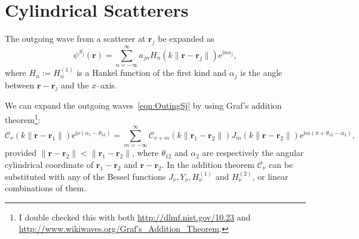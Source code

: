 \documentclass[ 12pt, a4paper]{article}
\newcommand{\be}{\begin{equation}}
\newcommand{\en}{\end{equation}}
\def\bga#1\ega{\begin{gather}#1\end{gather}} %
\newcommand{\ii}{\textrm{i}}
\newcommand{\ee}{\textrm{e}}
\renewcommand{\vec}[1]{\boldsymbol{#1}}
\begin{document}
\section{Cylindrical Scatterers}

The outgoing wave from a scatterer at $\vec r_j$ be expanded as
\be
\psi^{S_j}(\vec r) = \sum_{n=-\infty}^\infty a_{jn} H_n (k \|\vec r - \vec r_j \|) \ee^{\ii n \alpha_j},
\label{eqn:OutingSj}
\en
where $H_n:= H_n^{(1)}$ is a Hankel function of the first kind and $\alpha_j$ is the angle between $\vec r - \vec r_j$ and the $x$--axis.

We can expand the outgoing waves~\eqref{eqn:OutingSj} by using Graf's addition theorem\footnote{I double checked this with both \url{http://dlmf.nist.gov/10.23} and \url{http://www.wikiwaves.org/Graf's_Addition_Theorem}.}:
\be
\mathscr C_\nu (k \|  \vec r - \vec r_1\|) \ee^{ \ii \nu (\alpha_1 -\theta_{12})} =
           \sum_{m=-\infty}^\infty \mathscr C_{\nu +m} (k \| \vec r_1 - \vec r_2 \|) J_m(k \|\vec r- \vec r_2 \|) \ee^{ \ii m (\pi +\theta_{12} - \alpha_2)},
\label{eqn:Graf}
\en
provided $\|\vec r- \vec r_2 \|  < \|\vec r_1- \vec r_2 \|$, where $\theta_{12}$ and $\alpha_2$ are respectively the angular cylindrical coordinate of $\vec r_1 - \vec r_2$ and $\vec r -\vec r_2$.
In the addition theorem $\mathscr C_\nu$ can be substituted with any of the Bessel functions $J_\nu,Y_\nu,H_\nu^{(1)}$ and $H_\nu^{(2)}$, or linear combinations of them.
\end{document}
